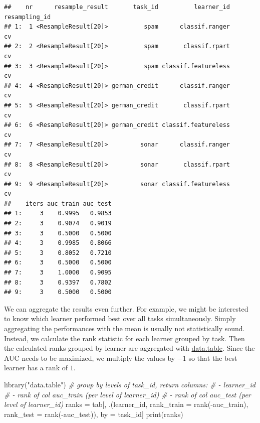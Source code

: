 \documentclass[
]{scrbook}
\newenvironment{Shaded}{\begin{snugshade}}{\end{snugshade}}
\newcommand{\AttributeTok}[1]{\textcolor[rgb]{0.77,0.63,0.00}{#1}}
\newcommand{\CommentTok}[1]{\textcolor[rgb]{0.56,0.35,0.01}{\textit{#1}}}
\newcommand{\FunctionTok}[1]{\textcolor[rgb]{0.00,0.00,0.00}{#1}}
\newcommand{\NormalTok}[1]{#1}
\newcommand{\OtherTok}[1]{\textcolor[rgb]{0.56,0.35,0.01}{#1}}
\newcommand{\SpecialCharTok}[1]{\textcolor[rgb]{0.00,0.00,0.00}{#1}}
\newcommand{\StringTok}[1]{\textcolor[rgb]{0.31,0.60,0.02}{#1}}
\renewenvironment{Shaded} {\begin{snugshade}\small} {\end{snugshade}}
\begin{document}
\begin{verbatim}
##    nr      resample_result       task_id          learner_id resampling_id
## 1:  1 <ResampleResult[20]>          spam      classif.ranger            cv
## 2:  2 <ResampleResult[20]>          spam       classif.rpart            cv
## 3:  3 <ResampleResult[20]>          spam classif.featureless            cv
## 4:  4 <ResampleResult[20]> german_credit      classif.ranger            cv
## 5:  5 <ResampleResult[20]> german_credit       classif.rpart            cv
## 6:  6 <ResampleResult[20]> german_credit classif.featureless            cv
## 7:  7 <ResampleResult[20]>         sonar      classif.ranger            cv
## 8:  8 <ResampleResult[20]>         sonar       classif.rpart            cv
## 9:  9 <ResampleResult[20]>         sonar classif.featureless            cv
##    iters auc_train auc_test
## 1:     3    0.9995   0.9853
## 2:     3    0.9074   0.9019
## 3:     3    0.5000   0.5000
## 4:     3    0.9985   0.8066
## 5:     3    0.8052   0.7210
## 6:     3    0.5000   0.5000
## 7:     3    1.0000   0.9095
## 8:     3    0.9397   0.7802
## 9:     3    0.5000   0.5000
\end{verbatim}

We can aggregate the results even further.
For example, we might be interested to know which learner performed best over all tasks simultaneously.
Simply aggregating the performances with the mean is usually not statistically sound.
Instead, we calculate the rank statistic for each learner grouped by task.
Then the calculated ranks grouped by learner are aggregated with \href{https://cran.r-project.org/package=data.table}{data.table}.
Since the AUC needs to be maximized, we multiply the values by \(-1\) so that the best learner has a rank of \(1\).

\begin{Shaded}
\begin{Highlighting}[]
\FunctionTok{library}\NormalTok{(}\StringTok{"data.table"}\NormalTok{)}
\CommentTok{\# group by levels of task\_id, return columns:}
\CommentTok{\# {-} learner\_id}
\CommentTok{\# {-} rank of col \textquotesingle{}{-}auc\_train\textquotesingle{} (per level of learner\_id)}
\CommentTok{\# {-} rank of col \textquotesingle{}{-}auc\_test\textquotesingle{} (per level of learner\_id)}
\NormalTok{ranks }\OtherTok{=}\NormalTok{ tab[, .(learner\_id, }\AttributeTok{rank\_train =} \FunctionTok{rank}\NormalTok{(}\SpecialCharTok{{-}}\NormalTok{auc\_train), }\AttributeTok{rank\_test =} \FunctionTok{rank}\NormalTok{(}\SpecialCharTok{{-}}\NormalTok{auc\_test)), by }\OtherTok{=}\NormalTok{ task\_id]}
\FunctionTok{print}\NormalTok{(ranks)}
\end{Highlighting}
\end{Shaded}
\end{document}

